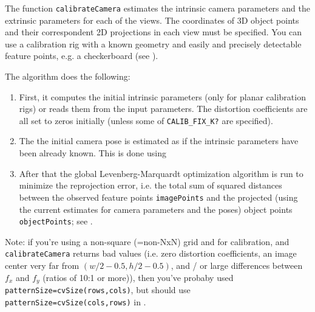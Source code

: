 \begin{description}
\begin{description}
{\begin{description}
\end{description}}
\end{description}

The function \texttt{calibrateCamera} estimates the intrinsic camera
parameters and the extrinsic parameters for each of the views. The
coordinates of 3D object points and their correspondent 2D projections
in each view must be specified. You can use a calibration rig with a known geometry and easily and precisely detectable feature points, e.g. a checkerboard (see ).

The algorithm does the following:
\begin{enumerate}
    \item First, it computes the initial intrinsic parameters (only for planar calibration rigs) or reads them from the input parameters. The distortion coefficients are all set to zeros initially (unless some of \texttt{CALIB\_FIX\_K?} are specified).
    \item The the initial camera pose is estimated as if the intrinsic parameters have been already known. This is done using 
    \item After that the global Levenberg-Marquardt optimization algorithm is run to minimize the reprojection error, i.e. the total sum of squared distances between the observed feature points \texttt{imagePoints} and the projected (using the current estimates for camera parameters and the poses) object points \texttt{objectPoints}; see .
\end{enumerate}

Note: if you're using a non-square (=non-NxN) grid and
 for calibration, and \texttt{calibrateCamera} returns
bad values (i.e. zero distortion coefficients, an image center very far from
$(w/2-0.5,h/2-0.5)$, and / or large differences between $f_x$ and $f_y$ (ratios of
10:1 or more)), then you've probaby used \texttt{patternSize=cvSize(rows,cols)},
but should use \texttt{patternSize=cvSize(cols,rows)} in .


\end{description}
